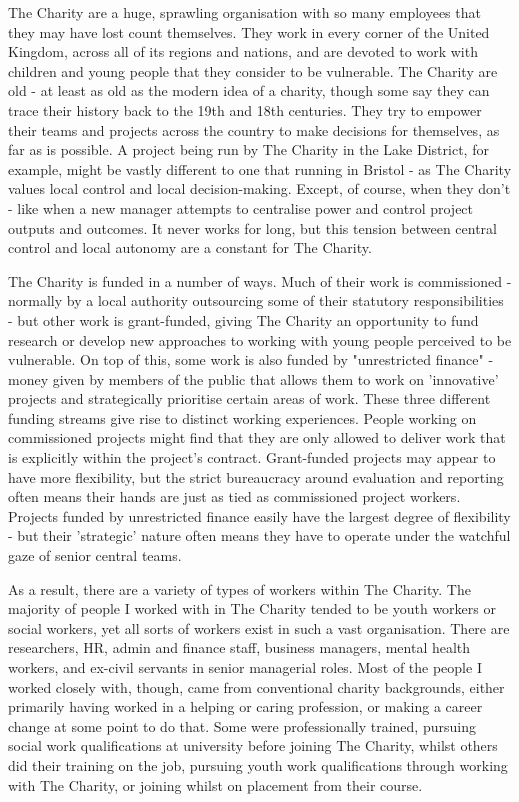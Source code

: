 The Charity are a huge, sprawling organisation with so many employees that they may have lost count themselves. They work in every corner of the United Kingdom, across all of its regions and nations, and are devoted to work with children and young people that they consider to be vulnerable. The Charity are old - at least as old as the modern idea of a charity, though some say they can trace their history back to the 19th and 18th centuries. They try to empower their teams and projects across the country to make decisions for themselves, as far as is possible. A project being run by The Charity in the Lake District, for example, might be vastly different to one that running in Bristol - as The Charity values local control and local decision-making. Except, of course, when they don’t - like when a new manager attempts to centralise power and control project outputs and outcomes. It never works for long, but this tension between central control and local autonomy are a constant for The Charity.

The Charity is funded in a number of ways. Much of their work is commissioned - normally by a local authority outsourcing some of their statutory responsibilities - but other work is grant-funded, giving The Charity an opportunity to fund research or develop new approaches to working with young people perceived to be vulnerable. On top of this, some work is also funded by "unrestricted finance" -  money given by members of the public that allows them to work on 'innovative' projects and strategically prioritise certain areas of work. These three different funding streams give rise to distinct working experiences. People working on commissioned projects might find that they are only allowed to deliver work that is explicitly within the project's contract. Grant-funded projects may appear to have more flexibility, but the strict bureaucracy around evaluation and reporting often means their hands are just as tied as commissioned project workers. Projects funded by unrestricted finance easily have the largest degree of flexibility - but their 'strategic' nature often means they have to operate under the watchful gaze of senior central teams. 

As a result, there are a variety of types of workers within The Charity. The majority of people I worked with in The Charity tended to be youth workers or social workers, yet all sorts of workers exist in such a vast organisation. There are researchers, HR, admin and finance staff, business managers, mental health workers, and ex-civil servants in senior managerial roles. Most of the people I worked closely with, though, came from conventional charity backgrounds, either primarily having worked in a helping or caring profession, or making a career change at some point to do that. Some were professionally trained, pursuing social work qualifications at university before joining The Charity, whilst others did their training on the job, pursuing youth work qualifications through working with The Charity, or joining whilst on placement from their course. 

